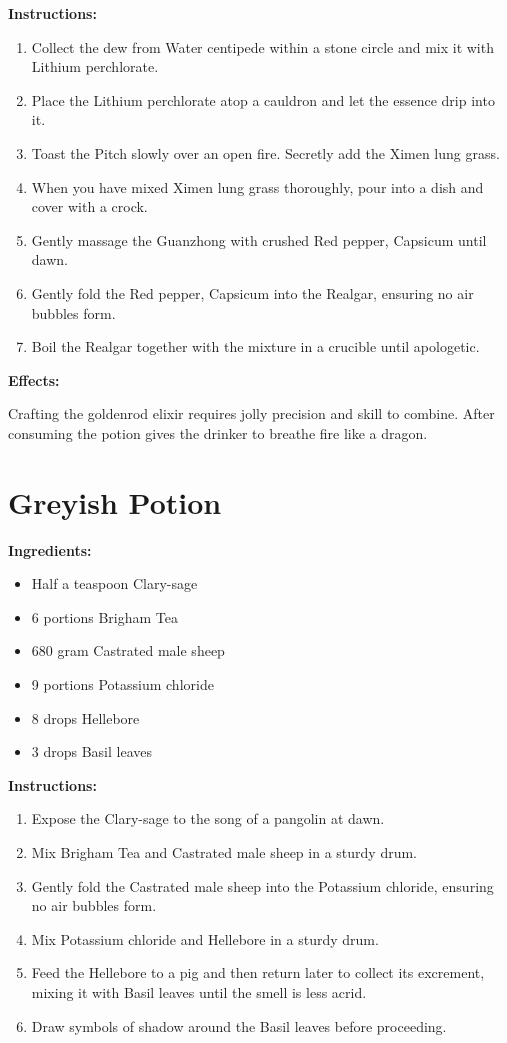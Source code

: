 \documentclass{article}
\begin{document}
\textbf{Instructions:}

\begin{enumerate}
  \item Collect the dew from Water centipede within a stone circle and mix it with Lithium perchlorate.
  \item Place the Lithium perchlorate atop a cauldron and let the essence drip into it.
  \item Toast the Pitch slowly over an open fire. Secretly add the Ximen lung grass.
  \item When you have mixed Ximen lung grass thoroughly, pour into a dish and cover with a crock.
  \item Gently massage the Guanzhong with crushed Red pepper, Capsicum until dawn.
  \item Gently fold the Red pepper, Capsicum into the Realgar, ensuring no air bubbles form.
  \item Boil the Realgar together with the mixture in a crucible until apologetic.
\end{enumerate}

\textbf{Effects:}

Crafting the goldenrod elixir requires jolly precision and skill to combine. After consuming the potion gives the drinker to breathe fire like a dragon.

\newpage
\section*{Greyish Potion}

\textbf{Ingredients:}

\begin{itemize}
  \item Half a teaspoon Clary-sage
  \item 6 portions Brigham Tea
  \item 680 gram Castrated male sheep
  \item 9 portions Potassium chloride
  \item 8 drops Hellebore
  \item 3 drops Basil leaves
\end{itemize}

\textbf{Instructions:}

\begin{enumerate}
  \item Expose the Clary-sage to the song of a pangolin at dawn.
  \item Mix Brigham Tea and Castrated male sheep in a sturdy drum.
  \item Gently fold the Castrated male sheep into the Potassium chloride, ensuring no air bubbles form.
  \item Mix Potassium chloride and Hellebore in a sturdy drum.
  \item Feed the Hellebore to a pig and then return later to collect its excrement, mixing it with Basil leaves until the smell is less acrid.
  \item Draw symbols of shadow around the Basil leaves before proceeding.
\end{enumerate}
\end{document}
